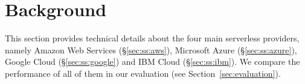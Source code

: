 \section{Background}\label{sec:background}
This section provides technical details about the four main serverless providers, namely Amazon Web Services (\S\ref{sec:ss:aws}), Microsoft Azure (\S\ref{sec:ss:azure}), Google Cloud (\S\ref{sec:ss:google}) and IBM Cloud (\S\ref{sec:ss:ibm}). 
  We compare the performance of all of them in our evaluation (see Section~\ref{sec:evaluation}).


